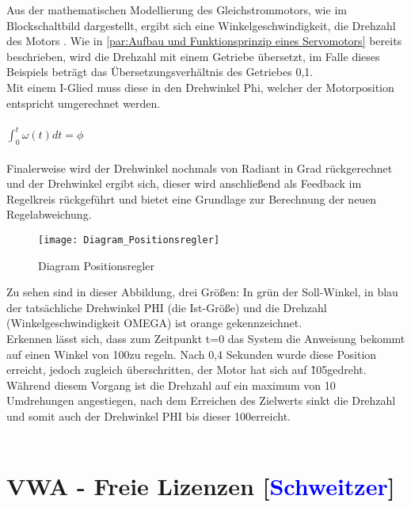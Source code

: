 \documentclass[titlepage,12pt,twoside]{article}
\begin{document}
Aus der mathematischen Modellierung des Gleichstrommotors, wie im Blockschaltbild 
dargestellt, ergibt sich eine Winkelgeschwindigkeit, die Drehzahl des Motors .
Wie in \textcolor{blue}{\autoref{par:Aufbau und Funktionsprinzip eines Servomotors}} 
bereits beschrieben, wird die Drehzahl mit einem Getriebe übersetzt, im Falle dieses 
Beispiels beträgt das Übersetzungsverhältnis des Getriebes 0,1. \\
Mit einem I-Glied muss diese in den Drehwinkel Phi, welcher der Motorposition 
entspricht umgerechnet werden. \\
\\
$\int_{0}^{t} \omega(t)dt = \phi$ \\
\\
Finalerweise wird der Drehwinkel nochmals von Radiant in Grad rückgerechnet und der 
Drehwinkel ergibt sich, dieser wird anschließend als Feedback im Regelkreis 
rückgeführt und bietet eine Grundlage zur Berechnung der neuen Regelabweichung. \\
\begin{figure}[H]
	\begin{center}
		\scalebox{1.2}
		{\texttt{[image: Diagram\_Positionsregler]}}
		\caption{Diagram Positionsregler}
		\label{fig:Diagram_Poositionsregler}
	\end{center}
\end{figure}
\hfill \break
Zu sehen sind in dieser Abbildung, drei Größen: In grün der Soll-Winkel, in blau der 
tatsächliche Drehwinkel PHI (die Ist-Größe) und die Drehzahl (Winkelgeschwindigkeit 
OMEGA) ist orange gekennzeichnet. \\
Erkennen lässt sich, dass zum Zeitpunkt t=0 das System die Anweisung bekommt auf 
einen Winkel von 100\textdegree zu regeln. Nach 0,4 Sekunden wurde diese Position erreicht, 
jedoch zugleich überschritten, der Motor hat sich auf \~105\textdegree gedreht. Während diesem 
Vorgang ist die Drehzahl auf ein maximum von 10 Umdrehungen angestiegen, nach dem 
Erreichen des Zielwerts sinkt die Drehzahl und somit auch der Drehwinkel PHI bis 
dieser 100\textdegree erreicht. \\
\\

\newpage

\section{VWA - Freie Lizenzen [\textcolor{blue}{Schweitzer}]}
\end{document}
